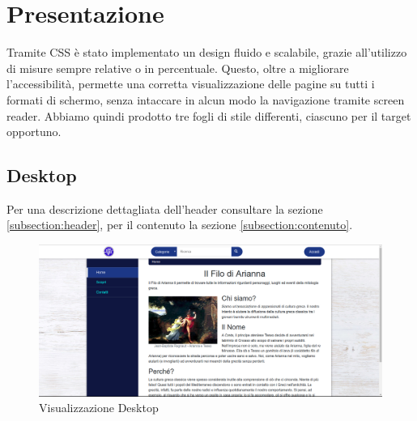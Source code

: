\section{Presentazione}
Tramite CSS è stato implementato un design fluido e scalabile, grazie all’utilizzo di misure sempre relative o in percentuale. Questo, oltre a migliorare l’accessibilità, permette una corretta visualizzazione delle pagine su tutti i formati di schermo, senza intaccare in alcun modo la navigazione tramite screen reader. Abbiamo quindi prodotto tre fogli di stile differenti, ciascuno per il target opportuno.

\subsection{Desktop}
Per una descrizione dettagliata dell'header consultare la sezione \ref{subsection:header}, per il contenuto la sezione \ref{subsection:contenuto}.\\
\begin{figure}[htbp]
	\begin{center}
		\includegraphics[width=13cm]{img/desktop.jpg}
		\caption{Visualizzazione Desktop}
	\end{center}
\end{figure}
\pagebreak
